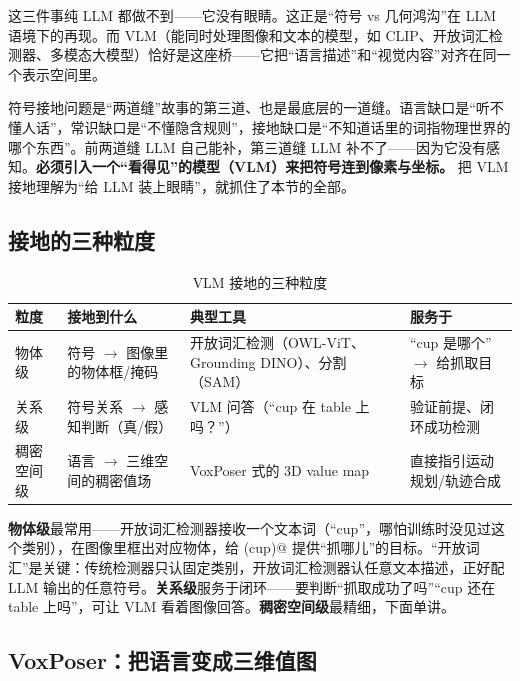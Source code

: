 \noindent 这三件事纯 LLM 都做不到——它没有眼睛。这正是“符号 vs 几何鸿沟”在 LLM 语境下的再现。而 VLM（能同时处理图像和文本的模型，如 CLIP、开放词汇检测器、多模态大模型）恰好是这座桥——它把“语言描述”和“视觉内容”对齐在同一个表示空间里。

\begin{insight}
符号接地问题是“两道缝”故事的第三道、也是最底层的一道缝。语言缺口是“听不懂人话”，常识缺口是“不懂隐含规则”，接地缺口是“不知道话里的词指物理世界的哪个东西”。前两道缝 LLM 自己能补，第三道缝 LLM 补不了——因为它没有感知。\textbf{必须引入一个“看得见”的模型（VLM）来把符号连到像素与坐标。} 把 VLM 接地理解为“给 LLM 装上眼睛”，就抓住了本节的全部。
\end{insight}

\subsection{接地的三种粒度}
\label{sec:grounding-granularity}

\begin{table}[H]\centering\small
\caption{VLM 接地的三种粒度}
\label{tab:grounding-granularity}
\begin{tabular}{p{2.4cm}p{3.4cm}p{4.0cm}p{3.0cm}}
\toprule
粒度 & 接地到什么 & 典型工具 & 服务于 \\
\midrule
物体级 & 符号 $\to$ 图像里的物体框/掩码 & 开放词汇检测（OWL-ViT、Grounding DINO）、分割（SAM） & “cup 是哪个” $\to$ 给抓取目标 \\
关系级 & 符号关系 $\to$ 感知判断（真/假） & VLM 问答（“cup 在 table 上吗？”） & 验证前提、闭环成功检测 \\
稠密空间级 & 语言 $\to$ 三维空间的稠密值场 & VoxPoser 式的 3D value map & 直接指引运动规划/轨迹合成 \\
\bottomrule
\end{tabular}
\end{table}

\noindent \textbf{物体级}最常用——开放词汇检测器接收一个文本词（“cup”，哪怕训练时没见过这个类别），在图像里框出对应物体，给 \verb@pick(cup)@ 提供“抓哪儿”的目标。“开放词汇”是关键：传统检测器只认固定类别，开放词汇检测器认任意文本描述，正好配 LLM 输出的任意符号。\textbf{关系级}服务于闭环——要判断“抓取成功了吗”“cup 还在 table 上吗”，可让 VLM 看着图像回答。\textbf{稠密空间级}最精细，下面单讲。

\subsection{VoxPoser：把语言变成三维值图}
\label{sec:voxposer}

